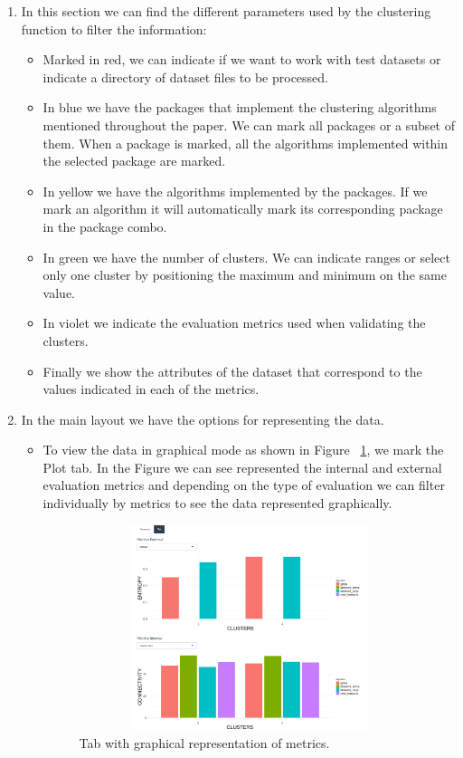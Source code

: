 \begin{enumerate}
  \item In this section we can find the different parameters used by the clustering function to filter the information:
  \begin{itemize}
  \item Marked in red, we can indicate if we want to work with test datasets or indicate a directory of dataset files to be processed.
  \item In blue we have the packages that implement the clustering algorithms mentioned throughout the paper. We can mark all packages or a subset of them. When a package is marked, all the algorithms implemented within the selected package are marked.
  \item In yellow we have the algorithms implemented by the packages. If we mark an algorithm it will automatically mark its corresponding package in the package combo.
  \item In green we have the number of clusters. We can indicate ranges or select only one cluster by positioning the maximum and minimum on the same value.
  \item In violet we indicate the evaluation metrics used when validating the clusters.
  \item Finally we show the attributes of the dataset that correspond to the values indicated in each of the metrics.
\end{itemize}
  \item In the main layout we have the options for representing the data.
  \begin{itemize}

    \item To view the data in graphical mode as shown in Figure ~\ref{fig:tab_graph}, we mark the Plot tab. In the Figure we can see represented the internal and external evaluation metrics and depending on the type of evaluation we can filter individually by metrics to see the data represented graphically.


  \begin{figure}[htbp]
    \centering
     \includegraphics[width=12cm, height=6cm]{img/tab_graph}
      \caption{Tab with graphical representation of metrics.}
      \label{fig:tab_graph}
  \end{figure}


\end{itemize}
\end{enumerate}
